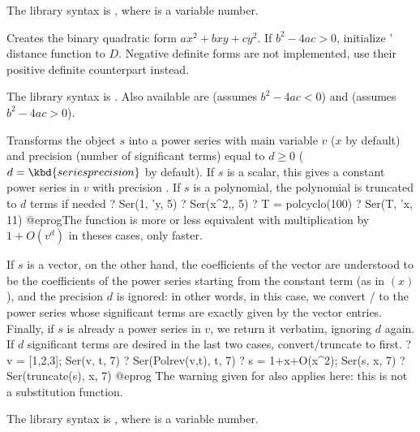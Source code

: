 The library syntax is , where  is a variable number.

\label{se:Qfb}
Creates the binary quadratic form
$ax^2+bxy+cy^2$. If $b^2-4ac>0$, initialize ' distance
function to $D$. Negative definite forms are not implemented,
use their positive definite counterpart instead.

The library syntax is .
Also available are
 (assumes $b^2-4ac<0$) and
 (assumes $b^2-4ac>0$).

\label{se:Ser}
Transforms the object $s$ into a power series with main variable $v$
($x$ by default) and precision (number of significant terms) equal to
$d \geq 0$ ($d = \kbd{seriesprecision}$ by default). If $s$ is a
scalar, this gives a constant power series in $v$ with precision .
If $s$ is a polynomial, the polynomial is truncated to $d$ terms if needed
\bprog
? Ser(1, 'y, 5)
? Ser(x^2,, 5)
? T = polcyclo(100)
? Ser(T, 'x, 11)
@eprog\noindent The function is more or less equivalent with multiplication by
$1 + O(v^d)$ in theses cases, only faster.

If $s$ is a vector, on the other hand, the coefficients of the vector are
understood to be the coefficients of the power series starting from the
constant term (as in $(x)$), and the precision $d$ is ignored:
in other words, in this case, we convert  /  to the power
series whose significant terms are exactly given by the vector entries.
Finally, if $s$ is already a power series in $v$, we return it verbatim,
ignoring $d$ again. If $d$ significant terms are desired in the last two
cases, convert/truncate to  first.
\bprog
? v = [1,2,3]; Ser(v, t, 7)
? Ser(Polrev(v,t), t, 7)
? s = 1+x+O(x^2); Ser(s, x, 7)
? Ser(truncate(s), x, 7)
@eprog\noindent
The warning given for  also applies here: this is not a substitution
function.

The library syntax is , where  is a variable number.

